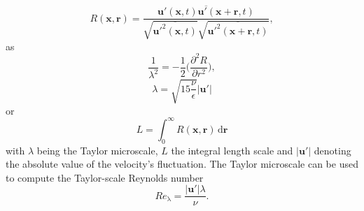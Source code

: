 \documentclass[11pt,a4paper,openany,oneside,parskip=half*]{article}
\renewcommand*\vec[1]{\boldsymbol{#1}}
\begin{document}
\begin{equation}
R (\vec{x}, \vec{r}) = \frac{\overline{\vec{u'}(\vec{x}, t)\vec{u'}(\vec{x} + \vec{r}, t)}}{\sqrt{\overline{\vec{u'}^2(\vec{x}, t)}}\sqrt{\overline{\vec{u'}^2(\vec{x} + \vec{r}, t)}}},
\end{equation}
as
\begin{equation}
 \frac{1}{\lambda^2} = -\frac{1}{2}\biggl(\frac{\partial^2 R}{\partial r^2}\biggl),
\end{equation}
\begin{equation}
\lambda = \sqrt{15 \frac{\nu}{\epsilon}} |\vec{u'}|
\end{equation}
or
\begin{equation} \label{eq:integralLengthScale}
L = \int_{0}^{\infty} R (\vec{x}, \vec{r})  \, \mathrm{d}\vec{r}
\end{equation}
with $\lambda$ being the Taylor microscale, $L$ the integral length scale and $|\vec{u'}|$ denoting the absolute value of the velocity's fluctuation.
\newline
The Taylor microscale can be used to compute the Taylor-scale Reynolds number
\begin{equation}
Re_\mathrm{\lambda} = \frac{|\vec{u'}| \lambda}{\nu}.
\end{equation}
\newline
\end{document}
